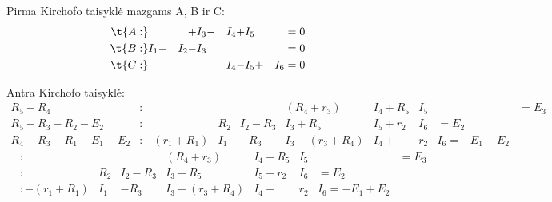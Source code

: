 \begin{exmp}

  Pirma Kirchofo taisyklė mazgams A, B ir C:
  \begin{align*}
    \t{A:}&  & + &I_{3} - &I_{4} + &I_{5} & &= 0 \\
    \t{B:} &I_{1} - &I_{2} - &I_{3} &&& &= 0\\
    \t{C:} &&&  &I_{4} - &I_{5} + &I_{6} &= 0
  \end{align*}

  Antra Kirchofo taisyklė:
  \begin{align*}
    R_{5}-R_{4}&: &&& (R_{4} + r_{3}) &I_{4} + R_{5}&I_{5} & &= E_{3} \\
    R_{5}-R_{3}-R_{2}-E_{2}&:
      & R_{2} &I_{2} - R_{3}&I_{3} + R_{5} &I_{5} + r_{2} &I_{6} &= E_{2} \\
    R_{4}-R_{3}-R_{1}-E_{1}-E_{2}&:
      -(r_{1} + R_{1}) &I_{1} & - R_{3} &I_{3} -
      (r_{3} + R_{4})&I_{4} + &r_{2} &I_{6} = -E_{1} + E_{2}
  \end{align*}
  \begin{align*}
    &:                  &             &              &        (R_{4} + r_{3}) &I_{4}  + R_{5}&I_{5} & &= E_{3} \\
    &:                  &       R_{2} &I_{2}  - R_{3}&I_{3}                           + R_{5}&I_{5} + r_{2} &I_{6} &= E_{2} \\
    &: -(r_{1} + R_{1}) &I_{1}        &       - R_{3}&I_{3} - (r_{3} + R_{4})&I_{4} + &r_{2} &I_{6} = -E_{1} + E_{2}
  \end{align*}

  
\end{exmp}
